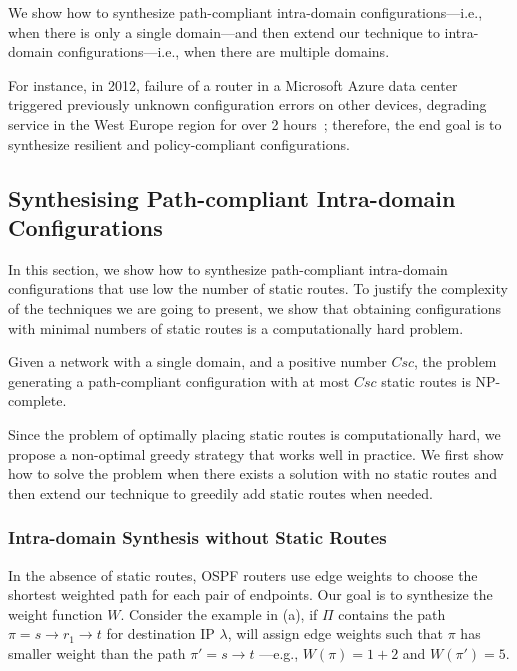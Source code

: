 We show how to synthesize  path-compliant  intra-domain configurations---i.e., when there
is only a single domain---and then extend our technique to
 intra-domain configurations---i.e., when
there are multiple domains.

For instance, in 2012,
failure of a router in a Microsoft Azure data center 
triggered previously unknown configuration errors on other 
devices, degrading service 
in the West Europe region for over 2
hours~\cite{azure}; therefore, the end goal is 
to synthesize resilient and policy-compliant 
configurations. 





\subsection{Synthesising Path-compliant Intra-domain Configurations} \label{sec:intra-synthesis}
In this section, we show how to synthesize  path-compliant  intra-domain configurations that
use low the number of static routes.
To justify the complexity of the techniques we are going to present,
we show that
obtaining configurations with minimal numbers of static routes is a 
computationally hard problem.
\begin{theorem}
\label{thm:ospfsynth}
Given a
network with a single domain,
and a positive number $Csc$,
the problem generating
a path-compliant configuration with at most $Csc$ static routes
is NP-complete.
\end{theorem}
\iffull

\fi
Since the problem of optimally placing static routes is computationally hard, 
we propose a non-optimal greedy strategy that works well in practice.
We first show how to solve the problem when there exists a solution with no static routes
and then extend our technique to greedily add static routes when needed.
			
\subsubsection{Intra-domain Synthesis without Static Routes} \label{sec:ospf}
 
In the absence of static routes,
 OSPF routers use edge weights
 to choose the
 shortest weighted path for each pair of endpoints. 
Our goal is to synthesize the weight function $W$.
Consider the example in (a), if $\Pi$ 
 contains the 
 path $\pi=s\rightarrow r_1 \rightarrow t$ for
 destination IP $\lambda$, \name will assign
 edge weights such that $\pi$ has
 smaller weight than the path $\pi'=s \rightarrow t$ ---e.g., $W(\pi)=1+2$
  and $W(\pi')=5$. 
 
